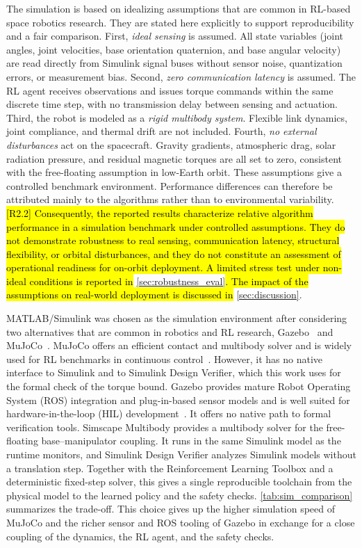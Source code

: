 \documentclass{ieeeaccess}
\newcommand{\hlone}[1]{{\sethlcolor{rone}\hl{#1}}}
\begin{document}
The simulation is based on idealizing assumptions that are common in RL-based space robotics research.
They are stated here explicitly to support reproducibility and a fair comparison. First, \emph{ideal
sensing} is assumed. All state variables (joint angles, joint velocities, base orientation quaternion,
and base angular velocity) are read directly from Simulink signal buses without sensor noise,
quantization errors, or measurement bias. Second, \emph{zero communication latency} is assumed. The RL
agent receives observations and issues torque commands within the same discrete time step, with no
transmission delay between sensing and actuation. Third, the robot is modeled as a \emph{rigid multibody
system}. Flexible link dynamics, joint compliance, and thermal drift are not included. Fourth, \emph{no
external disturbances} act on the spacecraft. Gravity gradients, atmospheric drag, solar radiation
pressure, and residual magnetic torques are all set to zero, consistent with the free-floating assumption
in low-Earth orbit. These assumptions give a controlled benchmark environment. Performance differences
can therefore be attributed mainly to the algorithms rather than to environmental variability.
\hlone{[R2.2] Consequently, the reported results characterize relative algorithm performance in a
simulation benchmark under controlled assumptions. They do not demonstrate robustness to real sensing,
communication latency, structural flexibility, or orbital disturbances, and they do not constitute an
assessment of operational readiness for on-orbit deployment. A limited stress test under non-ideal
conditions is reported in} \cref{sec:robustness_eval}\hlone{. The impact of the assumptions on real-world
deployment is discussed in} \cref{sec:discussion}.

MATLAB/Simulink was chosen as the simulation environment after considering two alternatives that are
common in robotics and RL research, Gazebo~\cite{koenig2004gazebo} and MuJoCo~\cite{todorov2012mujoco}.
MuJoCo offers an efficient contact and multibody solver and is widely used for RL benchmarks in
continuous control~\cite{korber2021comparing}. However, it has no native interface to
Simulink and to Simulink Design Verifier, which this work uses for the formal check of the torque bound.
Gazebo provides mature Robot Operating System (ROS) integration and plug-in-based sensor models and is
well suited for hardware-in-the-loop (HIL) development~\cite{collins2021review}. It offers no
native path to formal verification tools. Simscape Multibody provides a multibody solver for the
free-floating base--manipulator coupling. It runs in the same Simulink model as the runtime
monitors, and Simulink Design Verifier analyzes Simulink models without a translation step. Together
with the Reinforcement Learning Toolbox and a deterministic fixed-step solver, this gives a single
reproducible toolchain from the physical model to the learned policy and the safety checks.
\cref{tab:sim_comparison} summarizes the trade-off. This choice gives up the higher simulation speed of
MuJoCo and the richer sensor and ROS tooling of Gazebo in exchange for a close coupling of the dynamics,
the RL agent, and the safety checks.
\end{document}
